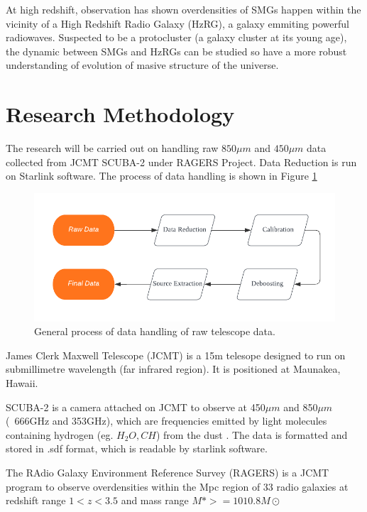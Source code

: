 \documentclass{article}
\begin{document}
\noindent At high redshift, observation has shown overdensities of SMGs happen within the vicinity of a High Redshift Radio Galaxy (HzRG), a galaxy emmiting powerful radiowaves. Suspected to be a protocluster (a galaxy cluster at its young age), the dynamic between SMGs and HzRGs can be studied so have a more robust understanding of evolution of masive structure of the universe.\parencite{Saxena2018}

\section{Research Methodology}

The research will be carried out on handling raw $850\mu m$ and $450\mu m$ data collected from JCMT SCUBA-2 under RAGERS Project. Data Reduction is run on Starlink software. The process of data handling is shown in Figure \ref{fig:flowchart1}
\medskip

\begin{figure}
    \centering
    \includegraphics[width=150mm]{Flowchart.png}
    \caption{General process of data handling of raw telescope data.}
    \label{fig:flowchart1}
\end{figure}

\noindent James Clerk Maxwell Telescope (JCMT) is a 15m telesope designed to run on submillimetre wavelength (far infrared region). It is positioned at Maunakea, Hawaii. 
\medskip

\noindent SCUBA-2 is a camera attached on JCMT to observe at 450$\mu m$ and 850$\mu m$ (~666GHz and 353GHz), which are frequencies emitted by light molecules containing hydrogen (eg. $H_2O,CH$) from the dust \parencite{Phillips2013}. The data is formatted and stored in .sdf format, which is readable by starlink software.
\medskip

\noindent The RAdio Galaxy Environment Reference Survey (RAGERS) is a JCMT program to observe overdensities within the Mpc region of 33 radio galaxies at redshift range $1 < z < 3.5$ and mass range $M\ast >=1010.8M\odot $ \parencite{ragers2021}
\medskip
\end{document}
